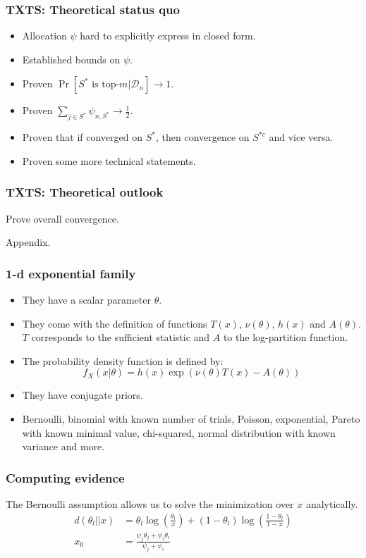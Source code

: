 \documentclass[aspectratio=43]{beamer}
\begin{document}
\begin{frame}
\frametitle{TXTS: Theoretical status quo}
\begin{itemize}
  \item Allocation $\psi$ hard to explicitly express in closed form.
  \item Established bounds on $\psi$.
  \item Proven $\Pr[S^* \text{ is top-}m | \mathcal{D}_n] \rightarrow 1$.
  \item Proven $\sum_{j \in S^*} \psi_{n, S^*} \rightarrow \frac{1}{2}$.
  \item Proven that if converged on $S^*$, then convergence on $S^{*c}$ and
      vice versa.
  \item Proven some more technical statements.
\end{itemize}
\end{frame}

\begin{frame}
\frametitle{TXTS: Theoretical outlook}
Prove overall convergence.
\end{frame}

\appendix

\begin{frame}
Appendix.
\end{frame}

\begin{frame}
\frametitle{1-d exponential family}
\begin{itemize}
  \item They have a scalar parameter $\theta$.
  \item They come with the definition of functions $T(x)$, $\nu(\theta)$, $h(x)$ and $A(\theta)$. $T$ corresponds to the sufficient statistic and $A$ to the log-partition function.
  \item The probability density function is defined by:
    \[f_X(x|\theta) = h(x) \exp(\nu(\theta) T(x) - A(\theta))\]
  \item They have conjugate priors.
  \item Bernoulli, binomial with known number of trials, Poisson,
      exponential, Pareto with known minimal value, chi-squared, normal
      distribution with known variance and more.
\end{itemize}
\end{frame}

\begin{frame}
\frametitle{Computing evidence}
The Bernoulli assumption allows us to solve the minimization over $x$ analytically.
\begin{align}
  d(\theta_l||x) &= \theta_l \log(\frac{\theta_l}{x}) + (1-\theta_l) \log(\frac{1-\theta_l}{1-x}) \label{eq:bernoulli_kl} \\
  x_0 &= \frac{\psi_j\theta_j + \psi_i\theta_i}{\psi_j + \psi_i}
\end{align}
\end{frame}
\end{document}
